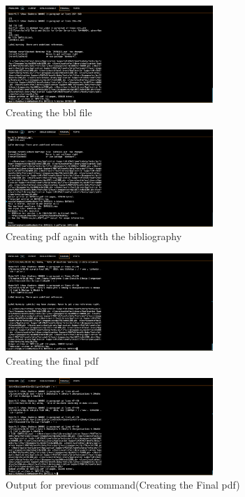 \documentclass[a4paper, 11pt]{report}
\begin{document}
\begin{figure}[H]
    \centering
    \includegraphics[width=0.7\textwidth]{com2}
    \caption{Creating the bbl file}
\end{figure}

\begin{figure}[H]
    \centering
    \includegraphics[width=0.7\textwidth]{com3}
    \caption{Creating pdf again with the bibliography}
\end{figure}

\begin{figure}[H]
    \centering
    \includegraphics[width=0.7\textwidth]{com4}
    \caption{Creating the final pdf}
\end{figure}

\begin{figure}[H]
    \centering
    \includegraphics[width=0.7\textwidth]{com5}
    \caption{Output for previous command(Creating the Final pdf)}
\end{figure}
\end{document}
